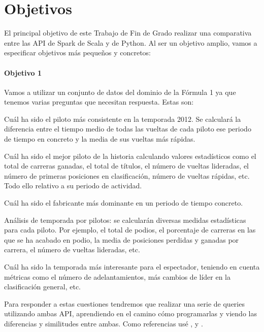 \documentclass[12pt,twoside,titlepage]{report}
\begin{document}
\chapter{Objetivos}
\newpage

El principal objetivo de este Trabajo de Fin de Grado realizar una comparativa entre las API de Spark de Scala y de Python. Al ser un objetivo amplio, vamos a especificar objetivos más pequeños y concretos:


\subsubsection{Objetivo 1}

Vamos a utilizar un conjunto de datos del dominio de la Fórmula 1 ya que tenemos varias preguntas que necesitan respuesta. Estas son:

\begin{compactitem}
  \item Cuál ha sido el piloto más consistente en la temporada 2012. Se calculará la diferencia entre el tiempo medio de todas las vueltas de cada piloto ese periodo de tiempo en concreto y la media de sus vueltas más rápidas.
  \item Cuál ha sido el mejor piloto de la historia calculando valores estadísticos como el total de carreras ganadas, el total de títulos, el número de vueltas lideradas, el número de primeras posiciones en clasificación, número de vueltas rápidas, etc. Todo ello relativo a su periodo de actividad.
  \item Cuál ha sido el fabricante más dominante en un periodo de tiempo concreto.
  \item Análisis de temporada por pilotos: se calcularán diversas medidas estadísticas para cada piloto. Por ejemplo, el total de podios, el porcentaje de carreras en las que se ha acabado en podio, la media de posiciones perdidas y ganadas por carrera, el número de vueltas lideradas, etc.
  \item Cuál ha sido la temporada más interesante para el espectador, teniendo en cuenta métricas como el número de adelantamientos, más cambios de líder en la clasificación general, etc.
\end{compactitem}

Para responder a estas cuestiones tendremos que realizar una serie de queries utilizando ambas API, aprendiendo en el camino cómo programarlas y viendo las diferencias y similitudes entre ambas. Como referencias usé \cite{sparkbook}, \cite{Spark} y \cite{PySpark}.
\end{document}
